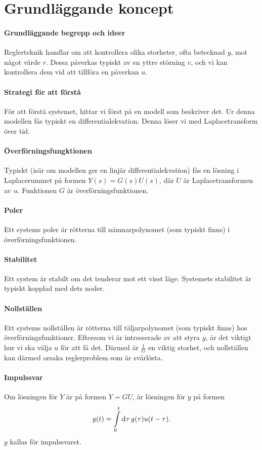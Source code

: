 \section{Grundläggande koncept}

\paragraph{Grundläggande begrepp och ideer}
Reglerteknik handlar om att kontrollera olika storheter, ofta betecknad $y$, mot något värde $r$. Dessa påverkas typiskt av en yttre störning $v$, och vi kan kontrollera dem vid att tillföra en påverkan $u$.

\paragraph{Strategi för att förstå}
För att förstå systemet, hittar vi först på en modell som beskriver det. Ur denna modellen fås typiskt en differentialekvation. Denna löser vi med Laplacetransform över tid.

\paragraph{Överförningsfungktionen}
Typiskt (isär om modellen ger en linjär differentialekvation) fås en lösning i Laplacerummet på formen $Y(s) = G(s)U(s)$, där $U$ är Laplacetransformen av $u$. Funktionen $G$ är överförningsfunktionen.

\paragraph{Poler}
Ett systems poler är rötterna till nämnarpolynomet (som typiskt finns) i överförningsfunktionen.

\paragraph{Stabilitet}
Ett system är stabilt om det tenderar mot ett visst läge. Systemets stabilitet är typiskt kopplad med dets noder.

\paragraph{Nollställen}
Ett systems nollställen är rötterna till täljarpolynomet (som typiskt finns) hos överförningsfunktioner. Eftersom vi är intresserade av att styra $y$, är det viktigt hur vi ska välja $u$ för att få det. Därmed är $\frac{1}{G}$ en viktig storhet, och nollställen kan därmed orsaka reglerproblem som är svårlösta.

\paragraph{Impulssvar}
Om lösningen för $Y$ är på formen $Y = GU$, är lösningen för $y$ på formen
\begin{align*}
	y(t) = \int\limits_{0}^{t}\dd[]{\tau}g(\tau)u(t - \tau).
\end{align*}
$g$ kallas för impulssvaret.